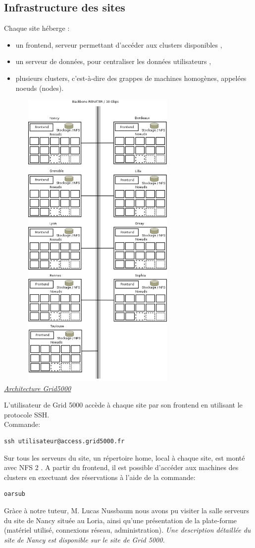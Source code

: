   \subsection{Infrastructure des sites}
Chaque site héberge :
\begin{itemize}
\item un frontend, serveur permettant d'accéder aux clusters disponibles ,
\item un serveur de données, pour centraliser les données utilisateurs ,
\item plusieurs clusters, c'est-à-dire des grappes de machines homogènes, appelées noeuds (nodes).
\end{itemize}
\begin{center}
\includegraphics[width=10cm,height=15cm]{images/g5k1.png}
\\
\underline{\textit{Architecture Grid5000}}
\end{center}
L'utilisateur de Grid 5000 accède à chaque site par son frontend en utilisant le protocole SSH.\\
Commande:
\begin{lstlisting}
ssh utilisateur@access.grid5000.fr
\end{lstlisting}
Sur tous les serveurs du site, un répertoire home, local à chaque site, est monté avec NFS 2 .
A partir du frontend, il est possible d'accéder aux machines des clusters en exectuant des réservations à l'aide de la commande:
\begin{lstlisting}
oarsub
\end{lstlisting}
Gràce à notre tuteur, M. Lucas Nussbaum nous avons pu visiter la salle serveurs du site de Nancy située au Loria, 
ainsi qu'une présentation de la plate-forme (matériel utilisé, connexions réseau,
administration).
\newline
\emph{Une description détaillée du site de Nancy est disponible sur le site de Grid 5000.}

